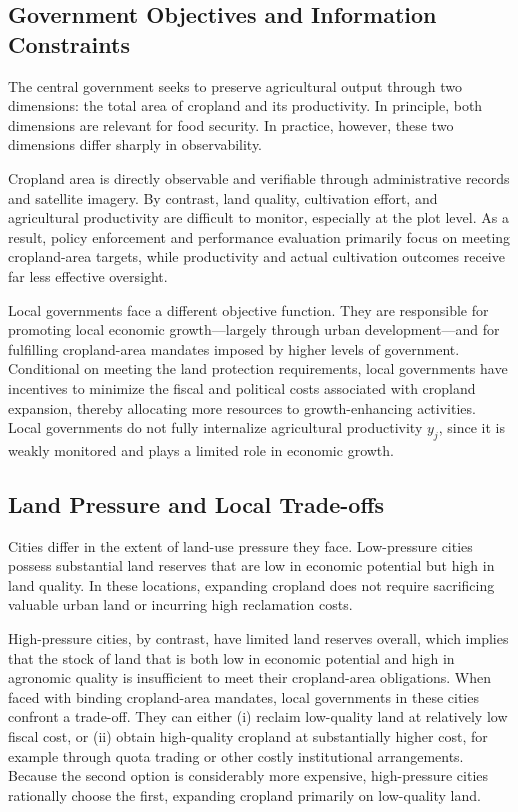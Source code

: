 \subsection{Government Objectives and Information Constraints}

The central government seeks to preserve agricultural output through two dimensions: the total area of cropland and its productivity. 
In principle, both dimensions are relevant for food security. 
In practice, however, these two dimensions differ sharply in observability.

Cropland area is directly observable and verifiable through administrative records and satellite imagery. By contrast, land quality, cultivation effort, and agricultural productivity are difficult to monitor, especially at the plot level. As a result, policy enforcement and performance evaluation primarily focus on meeting cropland-area targets, while productivity and actual cultivation outcomes receive far less effective oversight.

Local governments face a different objective function. They are responsible for promoting local economic growth---largely through urban development---and for fulfilling cropland-area mandates imposed by higher levels of government. 
Conditional on meeting the land protection requirements, local governments have incentives to minimize the fiscal and political costs associated with cropland expansion, thereby allocating more resources to growth-enhancing activities. Local governments do not fully internalize agricultural productivity $y_j$, since it is weakly monitored and plays a limited role in economic growth.

\subsection{Land Pressure and Local Trade-offs}

Cities differ in the extent of land-use pressure they face. 
Low-pressure cities possess substantial land reserves that are low in economic potential but high in land quality. 
In these locations, expanding cropland does not require sacrificing valuable urban land or incurring high reclamation costs.

High-pressure cities, by contrast, have limited land reserves overall, which implies that the stock of land that is both low in economic potential and high in agronomic quality is insufficient to meet their cropland-area obligations. When faced with binding cropland-area mandates, local governments in these cities confront a trade-off. 
They can either (i) reclaim low-quality land at relatively low fiscal cost, or (ii) obtain high-quality cropland at substantially higher cost, for example through quota trading or other costly institutional arrangements. Because the second option is considerably more expensive, high-pressure cities rationally choose the first, expanding cropland primarily on low-quality land.

